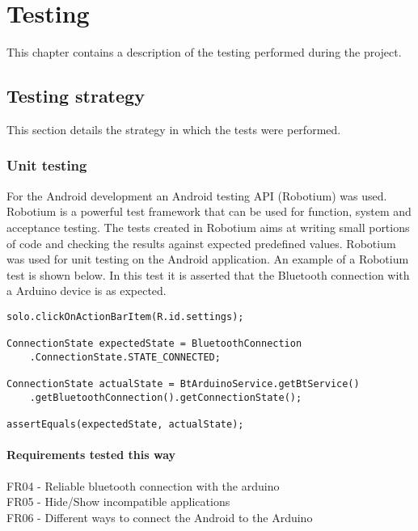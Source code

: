 \chapter{Testing}
	This chapter contains a description of the testing performed during the project. 
	
	\section{Testing strategy}
		This section details the strategy in which the tests were performed.
		\subsection{Unit testing}
			For the Android development an Android testing API (Robotium) was used. Robotium is a powerful test framework that can be used for function, system and acceptance testing. The tests created in Robotium aims at writing small portions of code and checking the results against expected predefined values. Robotium was used for unit testing on the Android application. An example of a Robotium test is shown below. In this test it is asserted that the Bluetooth connection with a Arduino device is as expected. \\

			\begin{lstlisting}
solo.clickOnActionBarItem(R.id.settings);

ConnectionState expectedState = BluetoothConnection
	.ConnectionState.STATE_CONNECTED;
	
ConnectionState actualState = BtArduinoService.getBtService()
	.getBluetoothConnection().getConnectionState();

assertEquals(expectedState, actualState);
			\end{lstlisting}

			\subsubsection{Requirements tested this way}
			FR04 - Reliable bluetooth connection with the arduino\\
			FR05 - Hide/Show incompatible applications\\
			FR06 - Different ways to connect the Android to the Arduino\\

